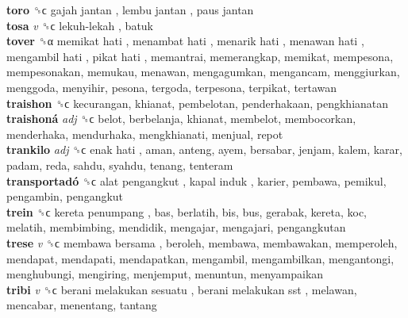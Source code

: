 \textbf{toro} ␝ϲ   gajah jantan ,  lembu jantan ,  paus jantan   \\
\textbf{tosa} \emph{v}  ␝ϲ   lekuh-lekah , batuk  \\
\textbf{tover} ␝α   memikat hati ,  menambat hati ,  menarik hati ,  menawan hati ,  mengambil hati ,  pikat hati , memantrai, memerangkap, memikat, mempesona, mempesonakan, memukau, menawan, mengagumkan, mengancam, menggiurkan, menggoda, menyihir, pesona, tergoda, terpesona, terpikat, tertawan  \\
\textbf{traishon} ␝ϲ  kecurangan, khianat, pembelotan, penderhakaan, pengkhianatan  \\
\textbf{traishoná} \emph{adj}  ␝ϲ  belot, berbelanja, khianat, membelot, membocorkan, menderhaka, mendurhaka, mengkhianati, menjual, repot  \\
\textbf{trankilo} \emph{adj}  ␝ϲ   enak hati , aman, anteng, ayem, bersabar, jenjam, kalem, karar, padam, reda, sahdu, syahdu, tenang, tenteram  \\
\textbf{transportadó} ␝ϲ   alat pengangkut ,  kapal induk , karier, pembawa, pemikul, pengambin, pengangkut  \\
\textbf{trein} ␝ϲ   kereta penumpang , bas, berlatih, bis, bus, gerabak, kereta, koc, melatih, membimbing, mendidik, mengajar, mengajari, pengangkutan  \\
\textbf{trese} \emph{v}  ␝ϲ   membawa bersama , beroleh, membawa, membawakan, memperoleh, mendapat, mendapati, mendapatkan, mengambil, mengambilkan, mengantongi, menghubungi, mengiring, menjemput, menuntun, menyampaikan  \\
\textbf{tribi} \emph{v}  ␝ϲ   berani melakukan sesuatu ,  berani melakukan sst , melawan, mencabar, menentang, tantang  \\
